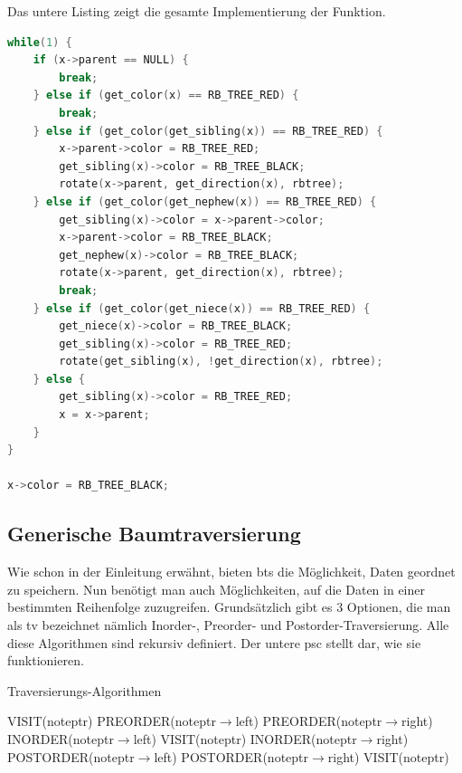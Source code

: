 \documentclass[11pt]{article}
\begin{document}
Das untere Listing zeigt die gesamte Implementierung der Funktion.

\begin{lstlisting}[language=C]
while(1) {
    if (x->parent == NULL) {
        break;
    } else if (get_color(x) == RB_TREE_RED) {
        break;
    } else if (get_color(get_sibling(x)) == RB_TREE_RED) {
        x->parent->color = RB_TREE_RED;
        get_sibling(x)->color = RB_TREE_BLACK;
        rotate(x->parent, get_direction(x), rbtree);
    } else if (get_color(get_nephew(x)) == RB_TREE_RED) {
        get_sibling(x)->color = x->parent->color;
        x->parent->color = RB_TREE_BLACK;
        get_nephew(x)->color = RB_TREE_BLACK;
        rotate(x->parent, get_direction(x), rbtree);
        break;
    } else if (get_color(get_niece(x)) == RB_TREE_RED) {
        get_niece(x)->color = RB_TREE_BLACK;
        get_sibling(x)->color = RB_TREE_RED;
        rotate(get_sibling(x), !get_direction(x), rbtree);
    } else {
        get_sibling(x)->color = RB_TREE_RED;
        x = x->parent;
    }
}

x->color = RB_TREE_BLACK;
\end{lstlisting}

\pagebreak
\subsection{Generische Baumtraversierung} \label{tr}
Wie schon in der Einleitung erwähnt, bieten \glspl{bt} die Möglichkeit, Daten geordnet zu speichern. Nun benötigt man auch Möglichkeiten, auf die Daten in einer bestimmten Reihenfolge zuzugreifen. Grundsätzlich gibt es 3 Optionen, die man als \gls{tv} bezeichnet nämlich Inorder-, Preorder- und Postorder-Traversierung.
Alle diese Algorithmen sind rekursiv definiert. \cite[S. 44ff]{aic}  Der untere \gls{psc} stellt dar, wie sie funktionieren.

\begin{algorithm}
  \caption{Traversierungs-Algorithmen}
  \begin{algorithmic}[1]
      \Return
    \EndIf
    \State VISIT(noteptr)
    \State PREORDER(noteptr$\rightarrow$left)
    \State PREORDER(noteptr$\rightarrow$right)
  \EndProcedure
      \Return
    \EndIf
    \State INORDER(noteptr$\rightarrow$left)
    \State VISIT(noteptr)
    \State INORDER(noteptr$\rightarrow$right)
  \EndProcedure
      \Return
    \EndIf
    \State POSTORDER(noteptr$\rightarrow$left)
    \State POSTORDER(noteptr$\rightarrow$right)
    \State VISIT(noteptr)
  \EndProcedure
  \end{algorithmic}
\end{algorithm}
\cite[S. 318ff]{aop}
\end{document}
